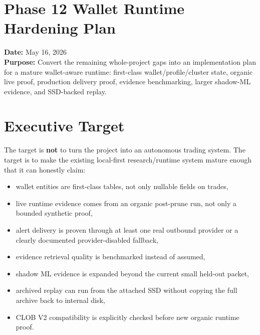 \documentclass{article}
\begin{document}
\section*{Phase 12 Wallet Runtime Hardening Plan}

\textbf{Date:} May 16, 2026\\
\textbf{Purpose:} Convert the remaining whole-project gaps into an implementation plan for a mature wallet-aware runtime: first-class wallet/profile/cluster state, organic live proof, production delivery proof, evidence benchmarking, larger shadow-ML evidence, and SSD-backed replay.

\section*{Executive Target}
The target is \textbf{not} to turn the project into an autonomous trading system. The target is to make the existing local-first research/runtime system mature enough that it can honestly claim:
\begin{itemize}[nosep]
\item wallet entities are first-class tables, not only nullable fields on trades,
\item live runtime evidence comes from an organic post-prune run, not only a bounded synthetic proof,
\item alert delivery is proven through at least one real outbound provider or a clearly documented provider-disabled fallback,
\item evidence retrieval quality is benchmarked instead of assumed,
\item shadow ML evidence is expanded beyond the current small held-out packet,
\item archived replay can run from the attached SSD without copying the full archive back to internal disk,
\item CLOB V2 compatibility is explicitly checked before new organic runtime proof.
\end{itemize}
\end{document}

